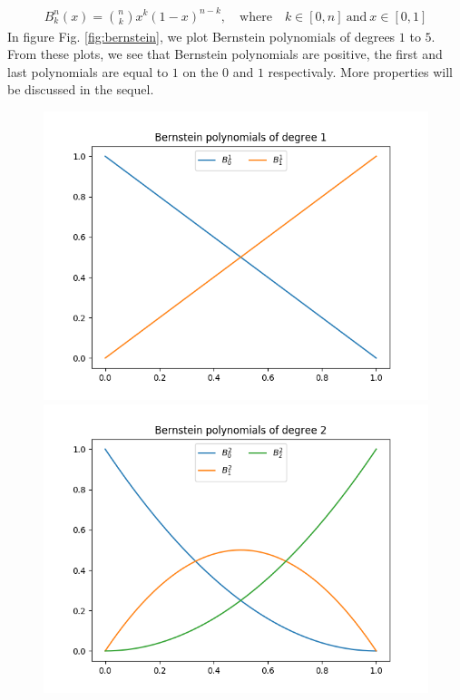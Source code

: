 \begin{align}
  B_k^n (x) =  \binom{n}{k} x^k (1-x)^{n-k}, \quad \mbox{where}\quad k \in \left[0, n \right] ~ \mbox{and} ~ x \in \left[ 0, 1 \right]
  \label{eq:bernstein}
\end{align}
\noindent
In figure Fig. \ref{fig:bernstein}, we plot Bernstein polynomials of degrees $1$ to $5$. From these plots, we see that Bernstein polynomials are positive, the first and last polynomials are equal to $1$ on the $0$ and $1$ respectivaly. More properties will be discussed in the sequel.

%
\begin{figure}[ht!]
\centering
\begin{minipage}[t]{0.43\textwidth}
  \centering
  \includegraphics[width=1.0\textwidth]{figures/cad/all_bernstein_degree_1}
\end{minipage}
\begin{minipage}[t]{0.43\textwidth}
  \centering
  \includegraphics[width=1.0\textwidth]{figures/cad/all_bernstein_degree_2}

\end{minipage}
\end{figure}
